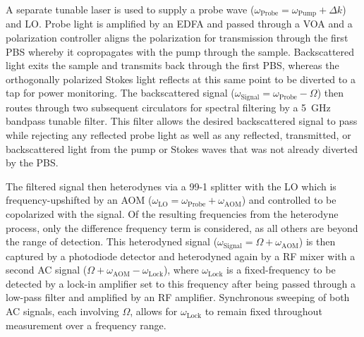 A separate tunable laser is used to supply a probe wave (\(\omega_{\mathrm{Probe}} = \omega_{\mathrm{Pump}} + \Delta k\)) and \ac{LO}. Probe light is amplified by an \ac{EDFA} and passed through a \ac{VOA} and a polarization controller aligns the polarization for transmission through the first \ac{PBS} whereby it copropagates with the pump through the sample. Backscattered light exits the sample and transmits back through the first \ac{PBS}, whereas the orthogonally polarized Stokes light reflects at this same point to be diverted to a tap for power monitoring. The backscattered signal (\(\omega_{\mathrm{Signal}} = \omega_{\mathrm{Probe}} - \Omega\)) then routes through two subsequent circulators for spectral filtering by a \SI{5}{\giga\hertz} bandpass tunable filter. This filter allows the desired backscattered signal to pass while rejecting any reflected probe light as well as any reflected, transmitted, or backscattered light from the pump or Stokes waves that was not already diverted by the PBS.

The filtered signal then heterodynes via a 99-1 splitter with the LO which is frequency-upshifted by an \ac{AOM} (\(\omega_{\mathrm{LO}} = \omega_{\mathrm{Probe}} + \omega_{\mathrm{AOM}}\)) and controlled to be copolarized with the signal. Of the resulting frequencies from the heterodyne process, only the difference frequency term is considered, as all others are beyond the range of detection. This heterodyned signal (\(\omega_{\mathrm{Signal}} = \Omega + \omega_{\mathrm{AOM}}\)) is then captured by a photodiode detector and heterodyned again by a \ac{RF} mixer with a second \ac{AC} signal (\(\Omega + \omega_{\mathrm{AOM}} - \omega_{\mathrm{Lock}}\)), where \(\omega_{\mathrm{Lock}}\) is a fixed-frequency to be detected by a lock-in amplifier set to this frequency after being passed through a low-pass filter and amplified by an \ac{RF} amplifier. Synchronous sweeping of both \ac{AC} signals, each involving \(\Omega\), allows for \(\omega_{\mathrm{Lock}}\) to remain fixed throughout measurement over a frequency range.

